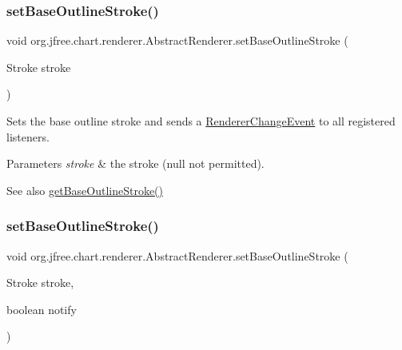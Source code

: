\subsubsection{\texorpdfstring{set\+Base\+Outline\+Stroke()}{setBaseOutlineStroke()}\hspace{0.1cm}{\footnotesize\ttfamily [1/2]}}
{\footnotesize\ttfamily void org.\+jfree.\+chart.\+renderer.\+Abstract\+Renderer.\+set\+Base\+Outline\+Stroke (\begin{DoxyParamCaption}\item[{Stroke}]{stroke }\end{DoxyParamCaption})}

Sets the base outline stroke and sends a \mbox{\hyperlink{}{Renderer\+Change\+Event}} to all registered listeners.


\begin{DoxyParams}{Parameters}
{\em stroke} & the stroke ({\ttfamily null} not permitted).\\
\hline
\end{DoxyParams}
\begin{DoxySeeAlso}{See also}
\mbox{\hyperlink{classorg_1_1jfree_1_1chart_1_1renderer_1_1_abstract_renderer_a8a73309c5c596b38434a7c3cbbc6f8e3}{get\+Base\+Outline\+Stroke()}} 
\end{DoxySeeAlso}
\mbox{\label{classorg_1_1jfree_1_1chart_1_1renderer_1_1_abstract_renderer_ae9b788eee2ee4506c4fe4dd219465dbb}} 
\subsubsection{\texorpdfstring{set\+Base\+Outline\+Stroke()}{setBaseOutlineStroke()}\hspace{0.1cm}{\footnotesize\ttfamily [2/2]}}
{\footnotesize\ttfamily void org.\+jfree.\+chart.\+renderer.\+Abstract\+Renderer.\+set\+Base\+Outline\+Stroke (\begin{DoxyParamCaption}\item[{Stroke}]{stroke,  }\item[{boolean}]{notify }\end{DoxyParamCaption})}

